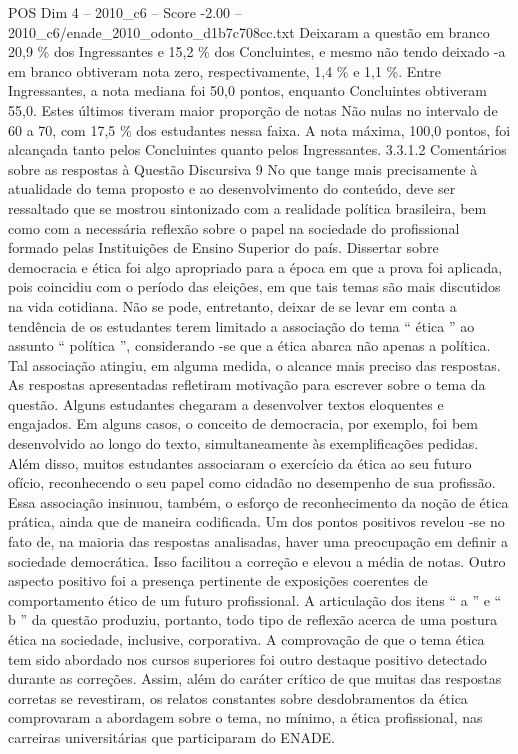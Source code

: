 \begin{textsample}{POS Dim 4 – 2010\_c6 – Score -2.00 – 2010\_c6/enade\_2010\_odonto\_d1b7c708cc.txt}
Deixaram a questão em branco 20,9 \% dos Ingressantes e 15,2 \% dos Concluintes, e mesmo não tendo deixado -a em branco obtiveram nota zero, respectivamente, 1,4 \% e 1,1 \%.
Entre Ingressantes, a nota mediana foi 50,0 pontos, enquanto Concluintes obtiveram 55,0.
Estes últimos tiveram maior proporção de notas Não nulas no intervalo de 60 a 70, com 17,5 \% dos estudantes nessa faixa.
A nota máxima, 100,0 pontos, foi alcançada tanto pelos Concluintes quanto pelos Ingressantes. 3.3.1.2 Comentários sobre as respostas à Questão Discursiva 9 No que tange mais precisamente à atualidade do tema proposto e ao desenvolvimento do conteúdo, deve ser ressaltado que se mostrou sintonizado com a realidade política brasileira, bem como com a necessária reflexão sobre o papel na sociedade do profissional formado pelas Instituições de Ensino Superior do país.
Dissertar sobre democracia e ética foi algo apropriado para a época em que a prova foi aplicada, pois coincidiu com o período das eleições, em que tais temas são mais discutidos na vida cotidiana.
Não se pode, entretanto, deixar de se levar em conta a tendência de os estudantes terem limitado a associação do tema “ ética ” ao assunto “ política ”, considerando -se que a ética abarca não apenas a política.
Tal associação atingiu, em alguma medida, o alcance mais preciso das respostas.
As respostas apresentadas refletiram motivação para escrever sobre o tema da questão.
Alguns estudantes chegaram a desenvolver textos eloquentes e engajados.
Em alguns casos, o conceito de democracia, por exemplo, foi bem desenvolvido ao longo do texto, simultaneamente às exemplificações pedidas.
Além disso, muitos estudantes associaram o exercício da ética ao seu futuro ofício, reconhecendo o seu papel como cidadão no desempenho de sua profissão.
Essa associação insinuou, também, o esforço de reconhecimento da noção de ética prática, ainda que de maneira codificada.
Um dos pontos positivos revelou -se no fato de, na maioria das respostas analisadas, haver uma preocupação em definir a sociedade democrática.
Isso facilitou a correção e elevou a média de notas.
Outro aspecto positivo foi a presença pertinente de exposições coerentes de comportamento ético de um futuro profissional.
A articulação dos itens “ a ” e “ b ” da questão produziu, portanto, todo tipo de reflexão acerca de uma postura ética na sociedade, inclusive, corporativa.
A comprovação de que o tema ética tem sido abordado nos cursos superiores foi outro destaque positivo detectado durante as correções.
Assim, além do caráter crítico de que muitas das respostas corretas se revestiram, os relatos constantes sobre desdobramentos da ética comprovaram a abordagem sobre o tema, no mínimo, a ética profissional, nas carreiras universitárias que participaram do ENADE.

\end{textsample}
